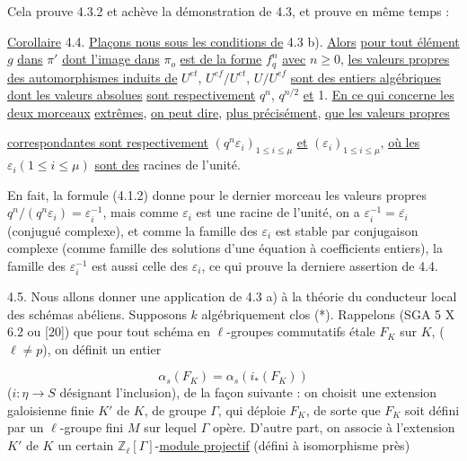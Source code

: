 Cela prouve 4.3.2 et achève la démonstration de 4.3, et prouve en même temps :

\underline{Corollaire} 4.4. \underline{Plaçons nous sous les conditions de} 4.3 b). \underline{Alors} \underline{pour tout élément} $g$ \underline{dans} $\pi'$ \underline{dont l'image dans} $\pi_o$ \underline{est de la forme} $f_q^n$ \underline{avec} $n \geq 0$, \underline{les valeurs propres des automorphismes induits de} $U^{et}$, $U^{ef}/U^{et}$, $U/U^{ef}$ \underline{sont des entiers algébriques dont les valeurs absolues} \underline{sont respectivement} $q^n$, $q^{n/2}$ \underline{et} 1. \underline{En ce qui concerne les deux morceaux} \underline{extrêmes}, \underline{on peut dire}, \underline{plus précisément}, \underline{que les valeurs propres}



\underline{correspondantes sont respectivement} $(q^n\varepsilon_i)_{1\leq i\leq\mu}$ \underline{et} $(\varepsilon_i)_{1\leq i\leq\mu}$, \underline{où les} $\varepsilon_i(1\leq i\leq\mu)$ \underline{sont des} racines de l'unité.

En fait, la formule (4.1.2) donne pour le dernier morceau les valeurs propres $q^n/(q^n\varepsilon_i) = \varepsilon_i^{-1}$, mais comme $\varepsilon_i$ est une racine de l'unité, on a $\varepsilon_i^{-1} = \overline{\varepsilon_i}$ (conjugué complexe), et comme la famille des $\varepsilon_i$ est stable par conjugaison complexe (comme famille des solutions d'une équation à coefficients entiers), la famille des $\varepsilon_i^{-1}$ est aussi celle des $\varepsilon_i$, ce qui prouve la derniere assertion de 4.4.

4.5. Nous allons donner une application de 4.3 a) à la théorie du conducteur local des schémas abéliens. Supposons $k$ algébriquement clos (*). Rappelons (SGA 5 X 6.2 ou [20]) que pour tout schéma en $\ell$-groupes commutatifs étale $F_K$ sur $K$, ($\ell \neq p$), on définit un entier

\begin{equation}\tag{4.5.1}
\alpha_s(F_K) = \alpha_s(i_*(F_K))
\end{equation}
($i : \eta \longrightarrow S$ désignant l'inclusion), de la façon suivante : on choisit une extension galoisienne finie $K'$ de $K$, de groupe $\Gamma$, qui déploie $F_K$, de sorte que $F_K$ soit défini par un $\ell$-groupe fini $M$ sur lequel $\Gamma$ opère. D'autre part, on associe à l'extension $K'$ de $K$ un certain $\mathbb{Z}_\ell[\Gamma]$-\underline{module projectif} (défini à isomorphisme près)

